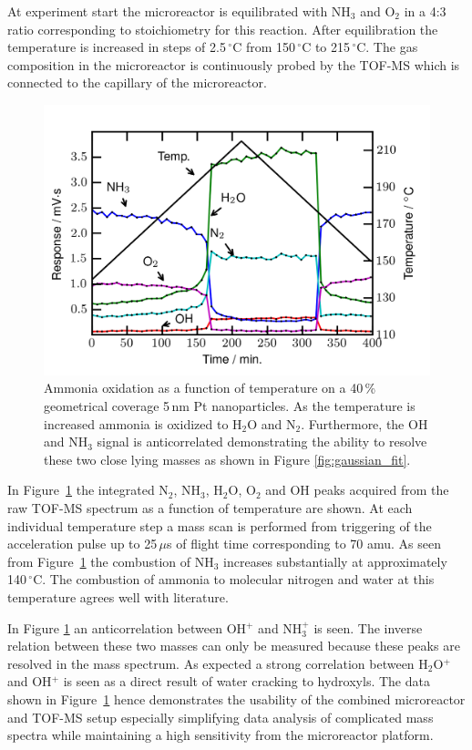 \documentclass[aip,rsi]{revtex4-1}
\begin{document}
At experiment start the microreactor is equilibrated with NH$_3$ and O$_2$ in a 4:3 ratio corresponding to stoichiometry for this reaction. After equilibration the temperature is increased in steps of 2.5\,$^{\circ}$C from 150\,$^{\circ}$C to 215\,$^{\circ}$C. The gas composition in the microreactor is continuously probed by the TOF-MS which is connected to the capillary of the microreactor.
\begin{figure}
 \includegraphics[width=14cm]{ammonia_reactivity.png}%
 \caption{Ammonia oxidation as a function of temperature on a 40\,\% geometrical coverage 5\,nm Pt nanoparticles. As the temperature is increased ammonia is oxidized to H$_2$O and N$_2$. Furthermore, the OH and NH$_3$ signal is anticorrelated demonstrating the ability to resolve these two close lying masses as shown in Figure \ref{fig:gaussian_fit}.\label{fig:ammonia_reactivity}}%
\end{figure}
In Figure~\ref{fig:ammonia_reactivity} the integrated N$_2$, NH$_3$, H$_2$O, O$_2$ and OH peaks acquired from the raw TOF-MS spectrum as a function of temperature are shown. At each individual temperature step a mass scan is performed from triggering of the acceleration pulse up to 25\,$\mu$s of flight time corresponding to 70 amu. As seen from Figure~\ref{fig:ammonia_reactivity} the combustion of NH$_3$ increases substantially at approximately 140\,$^{\circ}$C. The combustion of ammonia to molecular nitrogen and water at this temperature agrees well with literature\cite{Imbihl2007,Zeng2009}. 

In Figure \ref{fig:ammonia_reactivity} an anticorrelation between OH$^{+}$ and NH$_3^+$ is seen. The inverse relation between these two masses can only be measured because these peaks are resolved in the mass spectrum. As expected a strong correlation between H$_2$O$^{+}$ and OH$^+$ is seen as a direct result of water cracking to hydroxyls. The data shown in Figure~\ref{fig:ammonia_reactivity} hence demonstrates the usability of the combined microreactor and TOF-MS setup especially simplifying data analysis of complicated mass spectra while maintaining a high sensitivity from the microreactor platform.
\end{document}
